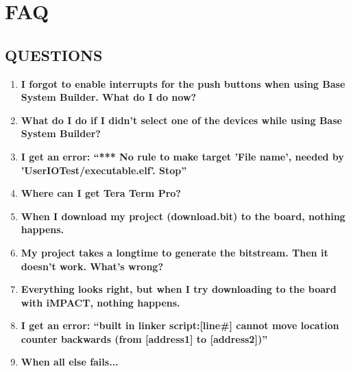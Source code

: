 \section{FAQ}
	
	\subsection{QUESTIONS}
		\begin{enumerate}
			\item \textbf{I forgot to enable interrupts for the push buttons when using Base System Builder. What do I do now?}
			\item \textbf{What do I do if I didn't select one of the devices while using Base System Builder?}
			\item \textbf{I get an error: ``*** No rule to make target 'File name', needed by 'UserIOTest/executable.elf'. Stop''} 
			\item \textbf{Where can I get Tera Term Pro?}
			\item \textbf{When I download my project (download.bit) to the board, nothing happens.}
			\item \textbf{My project takes a longtime to generate the bitstream. Then it doesn't work. What's wrong?}
			\item \textbf{Everything looks right, but when I try downloading to the board with iMPACT, nothing happens.}
			\item \textbf{I get an error: ``built in linker script:[line\#] cannot move location counter backwards (from [address1] to [address2])''}
			\item \textbf{When all else fails...}
		\end{enumerate}	
	
